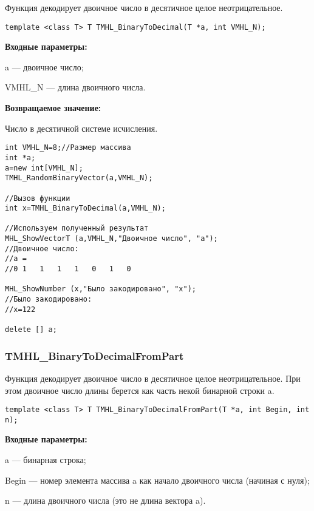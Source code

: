 \documentclass[a4paper,12pt]{article}
\begin{document}
Функция декодирует двоичное число в десятичное целое неотрицательное.


\begin{lstlisting}[label=code_syntax_TMHL_BinaryToDecimal,caption=Синтаксис]
template <class T> T TMHL_BinaryToDecimal(T *a, int VMHL_N);
\end{lstlisting}

\textbf{Входные параметры:}
 
 a --- двоичное число;
 
 VMHL\_N --- длина двоичного числа.
 
\textbf{Возвращаемое значение:}

 Число в десятичной системе исчисления.


\begin{lstlisting}[label=code_use_TMHL_BinaryToDecimal,caption=Пример использования]
int VMHL_N=8;//Размер массива
int *a;
a=new int[VMHL_N];
TMHL_RandomBinaryVector(a,VMHL_N);

//Вызов функции
int x=TMHL_BinaryToDecimal(a,VMHL_N);

//Используем полученный результат
MHL_ShowVectorT (a,VMHL_N,"Двоичное число", "a");
//Двоичное число:
//a =
//0	1	1	1	1	0	1	0

MHL_ShowNumber (x,"Было закодировано", "x");
//Было закодировано:
//x=122

delete [] a;
\end{lstlisting}

\subsubsection{TMHL\_BinaryToDecimalFromPart}\label{TMHL_BinaryToDecimalFromPart}

Функция декодирует двоичное число в десятичное целое неотрицательное. При этом двоичное число длины  берется как часть некой бинарной строки a.


\begin{lstlisting}[label=code_syntax_TMHL_BinaryToDecimalFromPart,caption=Синтаксис]
template <class T> T TMHL_BinaryToDecimalFromPart(T *a, int Begin, int n);
\end{lstlisting}

\textbf{Входные параметры:}
 
 a --- бинарная строка;
 
 Begin --- номер элемента массива a как начало двоичного числа (начиная с нуля);
 
 n --- длина двоичного числа (это не длина вектора a).
 
\end{document}
